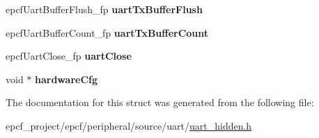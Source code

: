 \begin{DoxyCompactItemize}
\item 
\mbox{\label{structEPCFUartController_a5ce575bedf32400fd7c20186dc683c39}} 
epcf\+Uart\+Buffer\+Flush\+\_\+fp {\bfseries uart\+Tx\+Buffer\+Flush}
\item 
\mbox{\label{structEPCFUartController_afb167dd33d89b62d64fbeef9d521224f}} 
epcf\+Uart\+Buffer\+Count\+\_\+fp {\bfseries uart\+Tx\+Buffer\+Count}
\item 
\mbox{\label{structEPCFUartController_a88fea88c308fa329ae841b063ca03c39}} 
epcf\+Uart\+Close\+\_\+fp {\bfseries uart\+Close}
\item 
\mbox{\label{structEPCFUartController_a394758637b83731f2ff61b0c20586c5d}} 
void $\ast$ {\bfseries hardware\+Cfg}
\end{DoxyCompactItemize}


The documentation for this struct was generated from the following file\+:\begin{DoxyCompactItemize}
\item 
epcf\+\_\+project/epcf/peripheral/source/uart/\mbox{\hyperlink{uart__hidden_8h}{uart\+\_\+hidden.\+h}}\end{DoxyCompactItemize}
